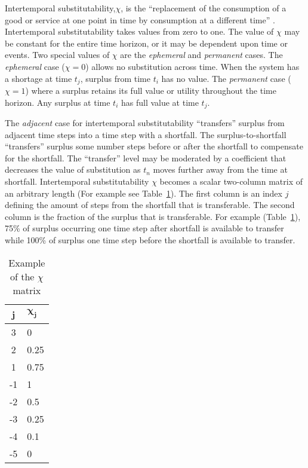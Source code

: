 Intertemporal substitutability,$\chi$, is the ``replacement of the consumption
of a good or service at one point in time by consumption at a
different time'' \cite{Black2013}. Intertemporal substitutability takes 
values from zero to one. The value of $\chi$ may be constant for the
entire time horizon, or it may be dependent upon time or events. Two
special values of $\chi$ are the \emph{ephemeral} and \emph{permanent}
cases. The \emph{ephemeral} case ($\chi = 0$) allows no substitution across
time. When the system has a shortage at time $t_j$, surplus from time
$t_i$ has no value. The  \emph{permanent} case ($\chi = 1$) where a
surplus retains its full value or utility throughout the time
horizon. Any surplus at time $t_i$ has full value at time $t_j$.



The \emph{adjacent}
case for intertemporal substitutability ``transfers'' surplus from adjacent
time steps into a time step with a shortfall. The surplus-to-shortfall
``transfers'' surplus some number steps before or after 
the shortfall to compensate for the shortfall. The ``transfer'' level may be moderated by a
coefficient that decreases the value of substitution as $t_n$ moves
further away from the time at shortfall.  Intertemporal
substitutability $\chi$ becomes a scalar two-column matrix of an
arbitrary length (For example see Table~\ref{t:chiVec}). The first
column is an index $j$ defining the amount 
of steps from the shortfall that is transferable. The second column is
the fraction of the surplus that is transferable. For example (Table~\ref{t:chiVec}),
 75\% of surplus occurring one time step after shortfall is available
 to transfer while 100\% of surplus one time step before the shortfall
 is available to transfer.


\begin{table}[h]
  \centering
  \begin{tabular}{c l }
    \hline
    \hline
    \textbf{j} & $\mathbf{\chi_j}$ \\
    \hline
    3 & 0 \\
    2 & 0.25 \\
    1 & 0.75 \\
    -1 & 1 \\
    -2 & 0.5 \\
    -3 & 0.25 \\
    -4 & 0.1 \\
    -5 & 0 \\
    \hline
  \end{tabular}
  \caption{Example of the $\chi$ matrix}
  \label{t:chiVec}
\end{table}

